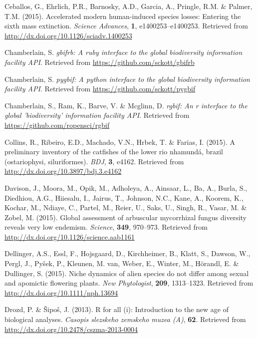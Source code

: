 \documentclass[3p]{elsarticle} %
\newlength{\cslhangindent}
\newenvironment{cslreferences}%
  {\setlength{\parindent}{0pt}%
  \everypar{\setlength{\hangindent}{\cslhangindent}}\ignorespaces}%
  {\par}
\begin{document}
\begin{cslreferences}
\leavevmode\hypertarget{ref-Ceballos_2015}{}%
Ceballos, G., Ehrlich, P.R., Barnosky, A.D., Garcia, A., Pringle, R.M.
\& Palmer, T.M. (2015). Accelerated modern human-induced species losses:
Entering the sixth mass extinction. \emph{Science Advances}, \textbf{1},
e1400253--e1400253. Retrieved from
\url{http://dx.doi.org/10.1126/sciadv.1400253}

\leavevmode\hypertarget{ref-gbifrb}{}%
Chamberlain, S. \emph{gbifrb: A ruby interface to the global
biodiversity information facility API}. Retrieved from
\url{https://github.com/sckott/gbifrb}

\leavevmode\hypertarget{ref-pygbif}{}%
Chamberlain, S. \emph{pygbif: A python interface to the global
biodiversity information facility API}. Retrieved from
\url{https://github.com/sckott/pygbif}

\leavevmode\hypertarget{ref-rgbif}{}%
Chamberlain, S., Ram, K., Barve, V. \& Mcglinn, D. \emph{rgbif: An r
interface to the global 'biodiversity' information facility API}.
Retrieved from \url{https://github.com/ropensci/rgbif}

\leavevmode\hypertarget{ref-Collins_2015}{}%
Collins, R., Ribeiro, E.D., Machado, V.N., Hrbek, T. \& Farias, I.
(2015). A preliminary inventory of the catfishes of the lower rio
nhamundá, brazil (ostariophysi, siluriformes). \emph{BDJ}, \textbf{3},
e4162. Retrieved from \url{http://dx.doi.org/10.3897/bdj.3.e4162}

\leavevmode\hypertarget{ref-Davison_2015}{}%
Davison, J., Moora, M., Opik, M., Adholeya, A., Ainsaar, L., Ba, A.,
Burla, S., Diedhiou, A.G., Hiiesalu, I., Jairus, T., Johnson, N.C.,
Kane, A., Koorem, K., Kochar, M., Ndiaye, C., Partel, M., Reier, U.,
Saks, U., Singh, R., Vasar, M. \& Zobel, M. (2015). Global assessment of
arbuscular mycorrhizal fungus diversity reveals very low endemism.
\emph{Science}, \textbf{349}, 970--973. Retrieved from
\url{http://dx.doi.org/10.1126/science.aab1161}

\leavevmode\hypertarget{ref-Dellinger_2015}{}%
Dellinger, A.S., Essl, F., Hojsgaard, D., Kirchheimer, B., Klatt, S.,
Dawson, W., Pergl, J., Pyšek, P., Kleunen, M. van, Weber, E., Winter,
M., Hörandl, E. \& Dullinger, S. (2015). Niche dynamics of alien species
do not differ among sexual and apomictic flowering plants. \emph{New
Phytologist}, \textbf{209}, 1313--1323. Retrieved from
\url{http://dx.doi.org/10.1111/nph.13694}

\leavevmode\hypertarget{ref-Drozd_2013}{}%
Drozd, P. \& Šipoš, J. (2013). R for all (i): Introduction to the new
age of biological analyses. \emph{Casopis slezskeho zemskeho muzea (A)},
\textbf{62}. Retrieved from
\url{http://dx.doi.org/10.2478/cszma-2013-0004}


\end{cslreferences}
\end{document}
